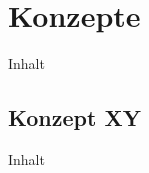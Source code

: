 \chapter{Konzepte\label{chap8:Achtes-Kapitel}}

Inhalt

\section{Konzept XY\label{sec8.1:Unterpunkt-1}}

Inhalt